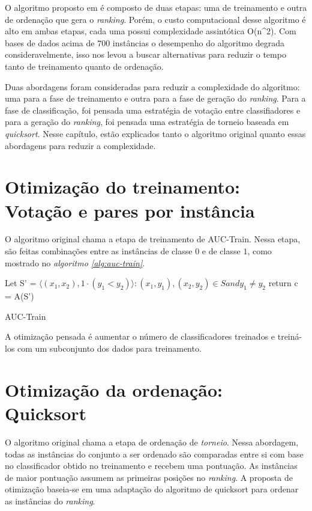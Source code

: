 O algoritmo proposto em \cite{langford08} é composto de duas etapas: uma de treinamento e outra de ordenação que gera o \emph{ranking}. Porém, o custo computacional desse algoritmo é alto em ambas etapas, cada uma possui complexidade assintótica O(n^2). Com bases de dados acima de $700$ instâncias o desempenho do algoritmo degrada consideravelmente, isso nos levou a buscar alternativas para reduzir o tempo tanto de treinamento quanto de ordenação.

Duas abordagens foram consideradas para reduzir a complexidade do algoritmo: uma para a fase de treinamento e outra para a fase de geração do \emph{ranking}. Para a fase de classificação, foi pensada uma estratégia de votação entre classifiadores e para a geração do \emph{ranking}, foi pensada uma estratégia de torneio baseada em \emph{quicksort}. Nesse capítulo, estão explicados tanto o algoritmo original quanto essas abordagens para reduzir a complexidade.

\section{Otimização do treinamento: Votação e pares por instância}
O algoritmo original chama a etapa de treinamento de AUC-Train. Nessa etapa, são feitas combinações entre as instâncias de classe $0$ e de classe $1$, como mostrado no \emph{ algoritmo \ref{alg:auc-train}}. 

\begin{algorithm}
\begin{algorithmic}

\STATE Let S' = ${\langle(x_1, x_2), 1\cdot(y_1 < y_2)\rangle :(x_1, y_1), (x_2, y_2) \in S and y_1 \neq y_2}$
\STATE return c = A(S')

\caption{AUC-Train}
\label{alg:auc-train}

\end{algorithmic}
\end{algorithm}

A otimização pensada é aumentar o número de classificadores treinados e treiná-los com um subconjunto dos dados para treinamento.

\section{Otimização da ordenação: Quicksort}
O algoritmo original chama a etapa de ordenação de \emph{torneio}. Nessa abordagem, todas as instâncias do conjunto a ser ordenado são comparadas entre si com base no classificador obtido no treinamento e recebem uma pontuação. As instâncias de maior pontuação assumem as primeiras posições no \emph{ranking}. A proposta de otimização baseia-se em uma adaptação do algoritmo de quicksort para ordenar as instâncias do \emph{ranking}.

